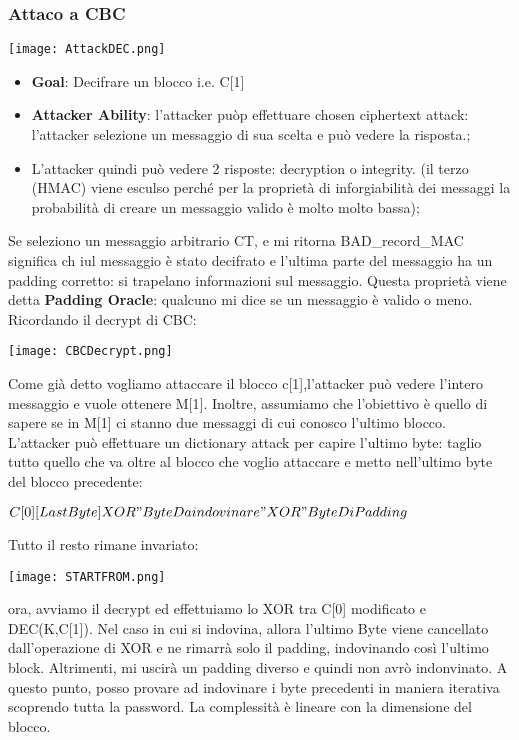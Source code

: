 \documentclass{article}
\theoremstyle{remark}
\begin{document}
\subsubsection{Attaco a CBC}
\begin{center}
    \texttt{[image: AttackDEC.png]}
\end{center}
\begin{itemize}
    \item \textbf{Goal}: Decifrare un blocco i.e. C[1]
    \item \textbf{Attacker Ability}: l'attacker puòp effettuare chosen ciphertext attack: l'attacker selezione un messaggio di sua scelta e può vedere la risposta.;
    \item L'attacker quindi può vedere 2 risposte: decryption o integrity. (il terzo (HMAC) viene esculso perché per la proprietà di inforgiabilità dei messaggi la probabilità di creare un messaggio valido è molto molto bassa);
\end{itemize}
Se seleziono un messaggio arbitrario CT, e mi ritorna BAD\_record\_MAC significa ch iul messaggio è stato decifrato e l'ultima parte del messaggio ha un padding corretto: si trapelano informazioni sul messaggio. Questa proprietà viene detta \textbf{Padding Oracle}: qualcuno mi dice se un messaggio è valido o meno. Ricordando il decrypt di CBC:
\begin{center}
    \texttt{[image: CBCDecrypt.png]}
\end{center}
Come già detto vogliamo attaccare il blocco c[1],l'attacker può vedere l'intero messaggio e vuole ottenere M[1]. Inoltre, assumiamo che l'obiettivo è quello di sapere se in M[1] ci stanno due messaggi di cui conosco l'ultimo blocco. L'attacker può effettuare un dictionary attack per capire l'ultimo byte: taglio tutto quello che va oltre al blocco che voglio attaccare e metto nell'ultimo byte del blocco precedente:\begin{center}
    $C[0][LastByte]XOR"ByteDaindovinare"XOR"ByteDiPadding$
\end{center}
Tutto il resto rimane invariato:\begin{center}
    \texttt{[image: STARTFROM.png]}
\end{center}
ora, avviamo il decrypt ed effettuiamo lo XOR tra C[0] modificato e DEC(K,C[1]). Nel caso in cui si indovina, allora l'ultimo Byte viene cancellato dall'operazione di XOR e ne rimarrà solo il padding, indovinando così l'ultimo block. Altrimenti, mi uscirà un padding diverso e quindi non avrò indonvinato. A questo punto, posso provare ad indovinare i byte precedenti in maniera iterativa scoprendo tutta la password. La complessità è lineare con la dimensione del blocco.
\end{document}
